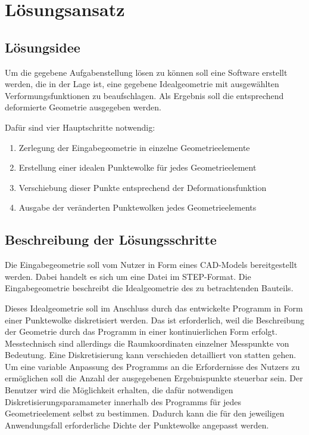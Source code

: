 \section{Lösungsansatz}

\subsection{Lösungsidee}

Um die gegebene Aufgabenstellung lösen zu können soll eine Software erstellt werden, die in der Lage ist, eine gegebene Idealgeometrie mit ausgewählten Verformungsfunktionen zu beaufschlagen. Als Ergebnis soll die entsprechend deformierte Geometrie ausgegeben werden. 

Dafür sind vier Hauptschritte notwendig: 

\begin{enumerate}
	\item Zerlegung der Eingabegeometrie in einzelne Geometrieelemente
	\item Erstellung einer idealen Punktewolke für jedes Geometrieelement
	\item Verschiebung dieser Punkte entsprechend der Deformationsfunktion
	\item Ausgabe der veränderten Punktewolken jedes Geometrieelements 
\end{enumerate}

\subsection{Beschreibung der Lösungsschritte}

Die Eingabegeometrie soll vom Nutzer in Form eines CAD-Models bereitgestellt werden. Dabei handelt es sich um eine Datei im STEP-Format. Die Eingabegeometrie beschreibt die Idealgeometrie des zu betrachtenden Bauteils.

Dieses Idealgeometrie soll im Anschluss durch das entwickelte Programm in Form einer Punktewolke diskretisiert werden. Das ist erforderlich, weil die Beschreibung der Geometrie durch das Programm in einer kontinuierlichen Form erfolgt. Messtechnisch sind allerdings die Raumkoordinaten einzelner Messpunkte von Bedeutung. Eine Diskretisierung kann verschieden detailliert von statten gehen. Um eine variable Anpassung des Programms an die Erfordernisse des Nutzers zu ermöglichen soll die Anzahl der ausgegebenen Ergebnispunkte steuerbar sein. Der Benutzer wird die Möglichkeit erhalten, die dafür notwendigen Diskretisierungsparamameter innerhalb des Programms für jedes Geometrieelement selbst zu bestimmen. Dadurch kann die für den jeweiligen Anwendungsfall erforderliche Dichte der Punktewolke angepasst werden.

